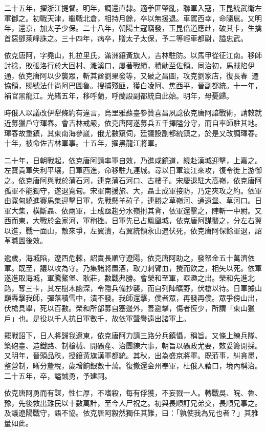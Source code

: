 \begin{pinyinscope}
二十五年，擢浙江提督。明年，調還直隸。適拳匪肇亂，聯軍入寇，玉昆統武衛左軍御之。初戰天津，繼戰北倉，相持月餘，卒以無援退。車駕西幸，命隨扈。又明年，還京，加太子少保。二十八年，朝陽土寇竊發，玉昆倍道應赴，破其卡，生擒首惡鄧萊峰誅之。三十四年，病卒，贈太子太保，予二等輕車都尉，謚忠武。

依克唐阿，字堯山，扎拉里氏，滿洲鑲黃旗人，吉林駐防。以馬甲從征江南。移師討捻，敗張洛行於大回村、濉溪口，屢著戰績，積勛至佐領。同治初，馬賊陷伊通，依克唐阿以少襲眾，斬其酋劉果發等，又破之昌圖，攻克劉家店，復長春，遷協領，賜號法什尚阿巴圖魯。搜捕殘匪，獲白凌阿、焦西平，晉副都統。十一年，補官黑龍江。光緒五年，移呼蘭，呼蘭設副都統自此始。明年，母憂歸。

時俄人以議改伊犁條約有違言，烏里雅蘇臺參贊喜昌夙諗依克唐阿諳戰術，請敕就近募獵戶守琿春。會吉林戒嚴，依克唐阿遂募兵五千擇隘分守，而自率師駐其地。琿春故重鎮，其東南海參崴，俄尤數窺伺，廷議設副都統鎮之，於是又改調琿春。十年，被命佐吉林軍事。十五年，擢黑龍江將軍。

二十年，日朝戰起，依克唐阿請率軍自效，乃進咸鏡道，繞赴漢城迎擊，上嘉之。左寶貴軍失利平壤，日軍西進，命移駐九連城。尋以日軍渡江來攻，復令徙上游御之。依克唐阿與戰於蒲石河，連克蒲石河口、古樓子。宋慶退駐大高嶺，依克唐阿孤軍不能獨守，遂退寬甸。宋軍南援旅、大，聶士成軍接防，乃定夾攻之約。依軍由寬甸繞進賽馬集迎擊日軍，先戰懸羊砬子，連勝之草嶺河、通遠堡、草河口。日軍大集，橫斷聶、依兩軍，士成亟趨分水嶺拊其背，依軍還擊之，陣斬一中尉。又西而東，大戰於金家河，軍稍挫。日軍先已占鳳凰城，依克唐阿謀襲之，分左右翼以進，戰一面山，敵來爭，左翼潰，右翼統領永山遇伏死，依克唐阿保餘軍退，詔革職圖後效。

逾歲，海城陷，遼西危棘，詔責長順守遼陽，依克唐阿助之，發帑金五十萬濟依軍。既至，議以攻為守。乃集諸將置酒，取刀刺臂血，攪而飲之，相矢以死。依軍遂進取海城，軍騰鰲堡、耿莊，數戰弗勝。會榮和至軍，亟趣之出。榮和先進北路，奪三卡，其左樹木幽深，令隱兵備抄襲，而自列陣曠野，伏槍以待。日軍據山巔轟擊我師，彈落積雪中，漬不發。我師還擊，僕者眾，再發再僕。眾爭傍山出，伏槍具舉，死以百數。榮和所部募自塞邊外，善避擊，傷者恆少，所謂「東山獵戶」也。是役以千人抗日軍數千，故依軍聲譽遠出諸軍上。

罷戰詔下，日人將歸我遼東，依克唐阿力請三路分兵鎮懾，稱旨。又條上練兵隊、築砲臺、造鐵路、制槍械、開礦產、治團練六事，朝旨以礦政尤要，敕妥籌開採。又明年，晉頭品秩，授鑲黃旗漢軍都統。其秋，出為盛京將軍。既蒞事，糾貪墨，整營制，晰分釐稅，歲增餉銀數十萬。復撤還金州奉軍，杜俄人藉口，境內稱治。二十五年，卒，謚誠勇，予建祠。

依克唐阿勇而有謀，性仁厚，不嗜殺，每有俘獲，不妄戮一人。轉戰吳、皖、魯、豫，先後救出難民以十數萬計，至今人尸祝之。初與長順訂兄弟交，長順兄事之。及議遼陽戰守，語不協。依克唐阿毅然獨任其難，曰：「孰使我為兄也者？」其雅量如此。


\end{pinyinscope}
